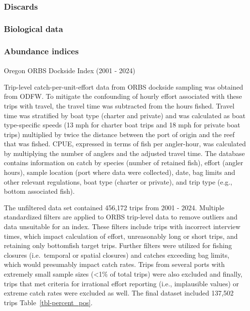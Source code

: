 \documentclass[
]{scrartcl}
\makeatletter
\let\oldparagraph\paragraph
\renewcommand{\paragraph}{
    \@ifstar
      \xxxParagraphStar
      \xxxParagraphNoStar
  }
\newcommand{\xxxParagraphStar}[1]{\oldparagraph*{#1}\mbox{}}
\newcommand{\xxxParagraphNoStar}[1]{\oldparagraph{#1}\mbox{}}
\makeatother
\begin{document}
\subsubsection{Discards}\label{discards}

\subsubsection{Biological data}\label{biological-data}

\subsubsection{Abundance indices}\label{abundance-indices}

\paragraph{Oregon ORBS Dockside Index (2001 -
2024)}\label{oregon-orbs-dockside-index-2001---2024}

Trip-level catch-per-unit-effort data from ORBS dockside sampling was
obtained from ODFW. To mitigate the confounding of hourly effort
associated with these trips with travel, the travel time was subtracted
from the hours fished. Travel time was stratified by boat type (charter
and private) and was calculated as boat type-specific speeds (13 mph for
charter boat trips and 18 mph for private boat trips) multiplied by
twice the distance between the port of origin and the reef that was
fished. CPUE, expressed in terms of fish per angler-hour, was calculated
by multiplying the number of anglers and the adjusted travel time. The
database contains information on catch by species (number of retained
fish), effort (angler hours), sample location (port where data were
collected), date, bag limits and other relevant regulations, boat type
(charter or private), and trip type (e.g., bottom associated fish).

The unfiltered data set contained 456,172 trips from 2001 - 2024.
Multiple standardized filters are applied to ORBS trip-level data to
remove outliers and data unsuitable for an index. These filters include
trips with incorrect interview times, which impact calculation of
effort, unreasonably long or short trips, and retaining only bottomfish
target trips. Further filters were utilized for fishing closures
(i.e.~temporal or spatial closures) and catches exceeding bag limits,
which would presumably impact catch rates. Trips from several ports with
extremely small sample sizes (\textless1\% of total trips) were also
excluded and finally, trips that met criteria for irrational effort
reporting (i.e., implausible values) or extreme catch rates were
excluded as well. The final dataset included 137,502 trips
Table~\ref{tbl-percent_pos}.
\end{document}
